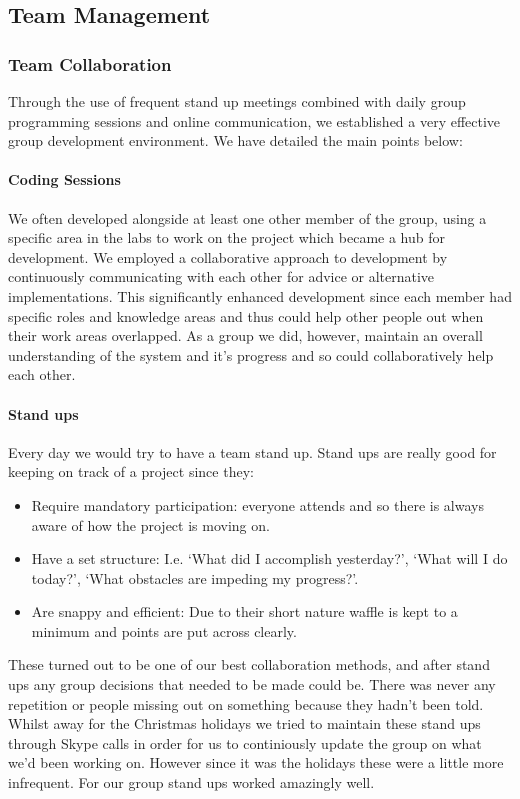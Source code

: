 \subsection{Team Management}
  \subsubsection{Team Collaboration}

    Through the use of frequent stand up meetings combined with daily group programming sessions and online communication, we established a very effective group development environment. We have detailed the main points below:

    \paragraph{Coding Sessions} We often developed alongside at least one other member of the group, using a specific area in the labs to work on the project which became a hub for development. We employed a collaborative approach to development by continuously communicating with each other for advice or alternative implementations. This significantly enhanced development since each member had specific roles and knowledge areas and thus could help other people out when their work areas overlapped. As a group we did, however, maintain an overall understanding of the system and it's progress and so could collaboratively help each other.

    \paragraph{Stand ups} Every day we would try to have a team stand up. Stand ups are really good for keeping on track of a project since they:
    \begin{itemize}
        \item Require mandatory participation: everyone attends and so there is always aware of how the project is moving on.
        \item Have a set structure: I.e. `What did I accomplish yesterday?', `What will I do today?', `What obstacles are impeding my progress?'.
        \item Are snappy and efficient: Due to their short nature waffle is kept to a minimum and points are put across clearly.
    \end{itemize}
    These turned out to be one of our best collaboration methods, and after stand ups any group decisions that needed to be made could be. There was never any repetition or people missing out on something because they hadn't been told.
    Whilst away for the Christmas holidays we tried to maintain these stand ups through Skype\cite{skype} calls in order for us to continiously update the group on what we'd been working on. However since it was the holidays these were a little more infrequent.
    For our group stand ups worked amazingly well.

